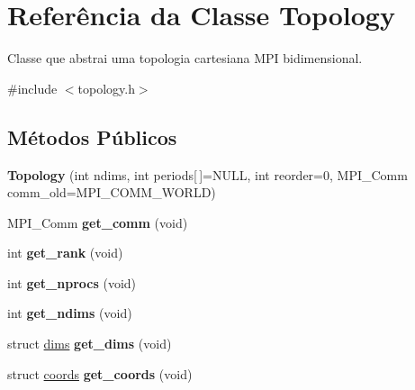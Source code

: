 \hypertarget{classTopology}{
\section{Referência da Classe Topology}
\label{classTopology}
}


Classe que abstrai uma topologia cartesiana MPI bidimensional.  




{\ttfamily \#include $<$topology.h$>$}

\subsection*{Métodos Públicos}
\begin{DoxyCompactItemize}
\item 
\hypertarget{classTopology_a742b5acc35a4e2759336f27fc939e3fa}{
{\bfseries Topology} (int ndims, int periods\mbox{[}$\,$\mbox{]}=NULL, int reorder=0, MPI\_\-Comm comm\_\-old=MPI\_\-COMM\_\-WORLD)}
\label{classTopology_a742b5acc35a4e2759336f27fc939e3fa}

\item 
\hypertarget{classTopology_aff6ac77fcbcceb73616d2bdad564357d}{
MPI\_\-Comm {\bfseries get\_\-comm} (void)}
\label{classTopology_aff6ac77fcbcceb73616d2bdad564357d}

\item 
\hypertarget{classTopology_a064d933db9fd96873120d79f235598f5}{
int {\bfseries get\_\-rank} (void)}
\label{classTopology_a064d933db9fd96873120d79f235598f5}

\item 
\hypertarget{classTopology_a089f1aa776a905fefaeaa84d2844ba85}{
int {\bfseries get\_\-nprocs} (void)}
\label{classTopology_a089f1aa776a905fefaeaa84d2844ba85}

\item 
\hypertarget{classTopology_a21ec1e654837bcedf60aa46fc41d6982}{
int {\bfseries get\_\-ndims} (void)}
\label{classTopology_a21ec1e654837bcedf60aa46fc41d6982}

\item 
\hypertarget{classTopology_a08ab8e6629ffb7623acfbd7344d7997a}{
struct \hyperlink{structdims}{dims} {\bfseries get\_\-dims} (void)}
\label{classTopology_a08ab8e6629ffb7623acfbd7344d7997a}

\item 
\hypertarget{classTopology_a694f2c2613745e792588e21d7501f3bf}{
struct \hyperlink{structcoords}{coords} {\bfseries get\_\-coords} (void)}
\label{classTopology_a694f2c2613745e792588e21d7501f3bf}


\end{DoxyCompactItemize}
